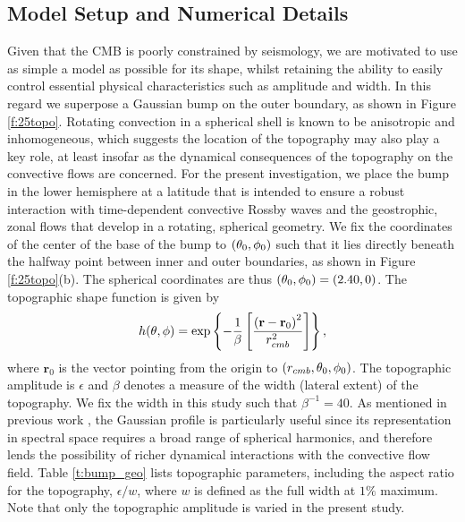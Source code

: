 \subsection{Model Setup and Numerical Details}

Given that the CMB is poorly constrained by seismology, we are motivated to use as simple a model as possible for its shape, whilst retaining the ability to easily control essential physical characteristics such as amplitude and width. 
In this regard we superpose a Gaussian bump on the outer boundary, as shown in Figure \ref{f:25topo}. 
Rotating convection in a spherical shell is known to be anisotropic and inhomogeneous, which suggests the location of the topography may also play a key role, at least insofar as the dynamical consequences of the topography on the convective flows are concerned. 
For the present investigation, we place the bump in the lower hemisphere at a latitude that is intended to ensure a robust interaction with time-dependent convective Rossby waves and the geostrophic, zonal flows that develop in a rotating, spherical geometry.
We fix the coordinates of the center of the base of the bump to \textcolor{\revtxt}{ $\left ( \theta_{0},\phi_{0}\right ) $} such that it lies directly beneath the halfway point between inner and outer boundaries, as shown in Figure \ref{f:25topo}(b). The spherical coordinates are thus $\left ( \theta_{0},\phi_{0}\right )  = \left ( 2.40,0\right ) $.
The topographic shape function is given by
\begin{equation}
	h(\theta, \phi) =  \exp \left\{ -\frac{1}{\beta}
	\ls\frac{ \lb \mathbf{r} - \mathbf{r}_0\rb^{2}}{r_{cmb}^{2}}
	\rs
	\right\},
	\label{e:25h}
\end{equation}
where $\mathbf{r}_{0}$ is the vector pointing from the origin to $\left ( { {r_{cmb}}},\theta_{0},\phi_{0}\right ) $. 
The topographic amplitude is $\epsilon$ and $\beta$ denotes a measure of the width (lateral extent) of the topography. We fix the width in this study such that $\beta^{-1} = 40.$
As mentioned in previous work \citep{mC12}, the Gaussian profile is particularly useful since its representation in spectral space requires a broad range of spherical harmonics, and therefore lends the possibility of richer dynamical interactions with the convective flow field. 
\textcolor{\revtxt}{
	Table \ref{t:bump_geo} lists topographic parameters, including the aspect ratio for the topography, $\epsilon /w$, where $w$ is defined as the full width at $1\%$ maximum. Note that only the topographic amplitude is varied in the present study.}

